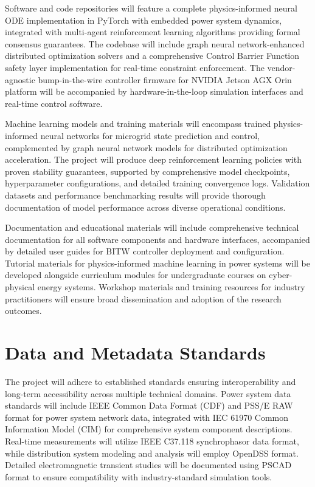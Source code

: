 \documentclass[12pt]{article}
\begin{document}
Software and code repositories will feature a complete physics-informed neural ODE implementation in PyTorch with embedded power system dynamics, integrated with multi-agent reinforcement learning algorithms providing formal consensus guarantees. The codebase will include graph neural network-enhanced distributed optimization solvers and a comprehensive Control Barrier Function safety layer implementation for real-time constraint enforcement. The vendor-agnostic bump-in-the-wire controller firmware for NVIDIA Jetson AGX Orin platform will be accompanied by hardware-in-the-loop simulation interfaces and real-time control software.

Machine learning models and training materials will encompass trained physics-informed neural networks for microgrid state prediction and control, complemented by graph neural network models for distributed optimization acceleration. The project will produce deep reinforcement learning policies with proven stability guarantees, supported by comprehensive model checkpoints, hyperparameter configurations, and detailed training convergence logs. Validation datasets and performance benchmarking results will provide thorough documentation of model performance across diverse operational conditions.

Documentation and educational materials will include comprehensive technical documentation for all software components and hardware interfaces, accompanied by detailed user guides for BITW controller deployment and configuration. Tutorial materials for physics-informed machine learning in power systems will be developed alongside curriculum modules for undergraduate courses on cyber-physical energy systems. Workshop materials and training resources for industry practitioners will ensure broad dissemination and adoption of the research outcomes.

\section{Data and Metadata Standards}

The project will adhere to established standards ensuring interoperability and long-term accessibility across multiple technical domains. Power system data standards will include IEEE Common Data Format (CDF) and PSS/E RAW format for power system network data, integrated with IEC 61970 Common Information Model (CIM) for comprehensive system component descriptions. Real-time measurements will utilize IEEE C37.118 synchrophasor data format, while distribution system modeling and analysis will employ OpenDSS format. Detailed electromagnetic transient studies will be documented using PSCAD format to ensure compatibility with industry-standard simulation tools.
\end{document}
